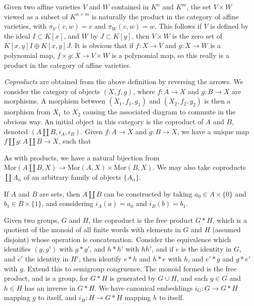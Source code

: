 \begin{example}
    Given two affine varieties $V$ and $W$ contained in $K^n$ and $K^m$, the set $V \times W$ viewed as a subset of $K^{n+m}$ is naturally the product in the category of affine varieties, with $\pi_V(v,w) = v$ and $\pi_W(v,w) = w$. This follows if $V$ is defined by the ideal $I \subset K[x]$, and $W$ by $J \subset K[y]$, then $V \times W$ is the zero set of $K[x,y]I \oplus K[x,y]J$. It is obvious that if $f: X \to V$ and $g: X \to W$ is a polynomial map, $f \times g: X \to V \times W$ is a polynomial map, so this really is a product in the category of affine varieties.
\end{example}

\emph{Coproducts} are obtained from the above definition by reversing the arrows. We consider the category of objects $(X,f,g)$, where $f: A \to X$ and $g: B \to X$ are morphisms. A morphism between $(X_1,f_1,g_1)$ and $(X_2,f_2,g_2)$ is then a morphism from $X_1$ to $X_2$ causing the associated diagram to commute in the obvious way. An initial object in this category is the coproduct of $A$ and $B$, denoted $(A \amalg B, i_A, i_B)$. Given $f: A \to X$ and $g: B \to X$, we have a unique map $f \amalg g: A \amalg B \to X$, such that
%
\begin{center}
\end{center}
%
As with products, we have a natural bijection from $\text{Mor}(A \amalg B,X) \to \text{Mor}(A,X) \times \text{Mor}(B,X)$. We may also take coproducts $\coprod A_\alpha$ of an arbitrary family of objects $\{ A_\alpha \}$.

\begin{example}
    If $A$ and $B$ are sets, then $A \amalg B$ can be constructed by taking $a_0 \in A \times \{ 0 \}$ and $b_1 \in B \times \{ 1 \}$, and considering $i_A(a) = a_0$ and $i_B(b) = b_1$. 
\end{example}

\begin{example}
    Given two groups, $G$ and $H$, the coproduct is the free product $G * H$, which is a quotient of the monoid of all finite words with elements in $G$ and $H$ (assumed disjoint) whose operation is concatenation. Consider the equivalence which identifies $(g,g')$ with $g * g'$, and $h * h'$ with $hh'$, and if $e$ is the identity in $G$, and $e'$ the identity in $H'$, then identify $e * h$ and $h * e$ with $h$, and $e' * g$ and $g * e'$ with $g$. Extend this to semigroup congruence. The monoid formed is the free product, and is a group, for $G * H$ is generated by $G \cup H$, and each $g \in G$ and $h \in H$ has an inverse in $G * H$. We have canonical embeddings $i_G: G \to G * H$ mapping $g$ to itself, and $i_H: H \to G * H$ mapping $h$ to itself.
\end{example}

